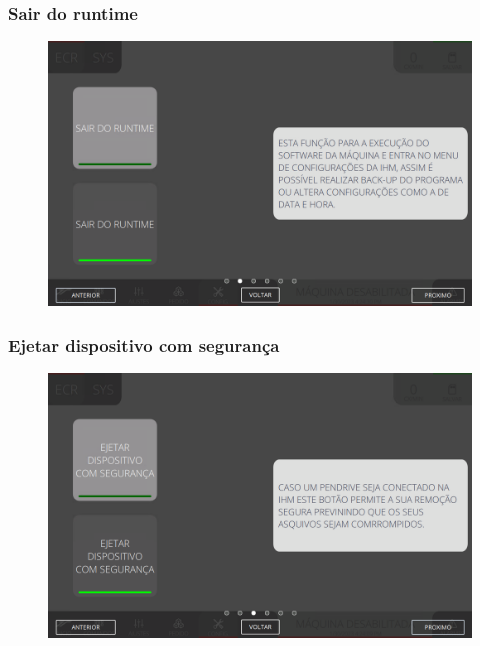 \newpage
\thispagestyle{fancy}
\vspace*{40 pt}
\subsubsection{\small{Sair do runtime}} \label{sec:telaConfiguracaoTelaSairDoRuntime}
\vspace*{\fill}
\begin{figure}[h]
    \centering
    \includegraphics[width=576 px,height=360 px]{src/imagesICV/10-configuration/2.png}
\end{figure}
\vspace*{\fill}

\newpage
\thispagestyle{fancy}
\vspace*{40 pt}
\subsubsection{\small{Ejetar dispositivo com segurança}} \label{sec:telaConfiguracaoTelaEjetarDispositivoComSeguranca}
\vspace*{\fill}
\begin{figure}[h]
    \centering
    \includegraphics[width=576 px,height=360 px]{src/imagesICV/10-configuration/3.png}
\end{figure}
\vspace*{\fill}

